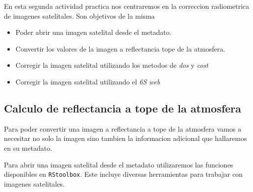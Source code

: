 
En esta segunda actividad practica nos centraremos en la correccion radiometrica
de imagenes satelitales. Son objetivos de la misma

\begin{itemize}
    \item Poder abrir una imagen satelital desde el metadato.
    \item Convertir los valores de la imagen a reflectancia tope de la
        atmosfera.
    \item Corregir la imagen satelital utilizando los metodos de \emph{dos} y
        \emph{cost}
    \item Corregir la imagen satelital utilizando el \emph{6S web}
\end{itemize}

\subsection{Calculo de reflectancia a tope de la atmosfera}

Para poder convertir una imagen a reflectancia a tope de la atmosfera vamos a
necesitar no solo la imagen sino tambien la informacion adicional que hallaremos
en su metadato.

Para abrir una imagen satelital desde el metadato utilizaremos las funciones
disponibles en \texttt{RStoolbox}. Este incluye diversas herramientas
para trabajar con imagenes satelitales.

